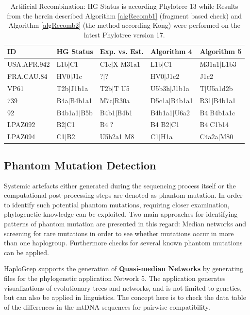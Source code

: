 \begin{table}[H]
\centering

\begin{tabular}{lllll}
ID & HG Status & Exp. vs. Est. & Algorithm 4 & Algorithm 5\\ \midrule
USA.AFR.942 & L1b$|$C1 & C1c$|$X M31a1 & L1b$|$C1 &  M31a1$|$L1b3 \\
FRA.CAU.84 & HV0$|$J1c & ?$|$? & HV0$|$J1c2 & J1c2 \\
VP61 & T2b$|$J1b1a & T2b$|$T U5 & U5b3h$|$J1b1a & T$|$U5a1d2b \\
739 & B4a$|$B4b1a1 & M7c$|$R30a & D5c1a$|$B4b1a1 & R31$|$B4b1a1 \\
92 & B4b1a1$|$B5b & B4b1$|$B4b1& B4b1a1$|$U6a2 & B4$|$B4b1a1c \\
LPAZ092 & B2$|$C1 & B4$|$?& B4 B2$|$C1 & B4$|$C1b14 \\
LPAZ094 & C1$|$B2&U5b2a1 M8& C1$|$H1a & C4a2a$|$M80 
\end{tabular}
\caption{Artificial Recombination: HG Status is according Phylotree 13 while Results from the herein described Algorithm   \ref{algRecomb1} (fragment based check) and Algorithm \ref{algRecomb2} (the method according Kong) were performed on the latest Phylotree version 17.}
\label{table:recomb}
\end{table}

\subsection{Phantom Mutation Detection}
\label{hg:phantom}
Systemic artefacts either generated during the sequencing process itself or the computational post-processing steps are denoted as phantom mutation. In order to identify such potential phantom mutations, requiring closer examination, phylogenetic knowledge can be exploited. Two main approaches for identifying patterns of phantom mutation are presented in this regard: Median networks and screening for rare mutations in order to see whether mutations occur in more than one haplogroup. Furthermore checks for several known phantom mutations can be applied. 

HaploGrep supports the generation of \textbf{Quasi-median Networks} by generating files for the phylogenetic application Network 5. The application generates visualizations of evolutionary trees and networks, and is not limited to genetics, but can also be applied in linguistics. The concept here is to check the data table of the differences in the mtDNA sequences for pairwise compatibility. 

